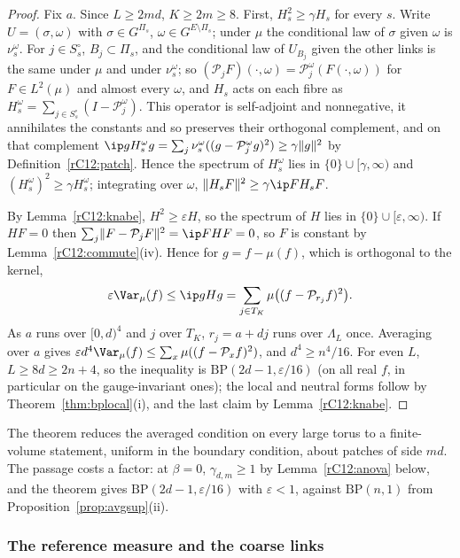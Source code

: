 \begin{proof}
Fix $a$. Since $L\ge2md$, $K\ge2m\ge8$. First, $H_s^2\ge\gamma H_s$ for
every $s$. Write $U=(\sigma,\omega)$ with $\sigma\in G^{\Pi_s}$, $\omega\in
G^{E\setminus\Pi_s}$; under $\mu$ the conditional law of $\sigma$ given
$\omega$ is $\nu^\omega_s$. For $j\in S^\circ_s$, $B_j\subset\Pi_s$, and the
conditional law of $U_{B_j}$ given the other links is the same under $\mu$
and under $\nu^\omega_s$; so $(\mathcal P_jF)(\cdot,\omega)=\mathcal
P^\omega_j(F(\cdot,\omega))$ for $F\in L^2(\mu)$ and almost every $\omega$,
and $H_s$ acts on each fibre as $H^\omega_s=\sum_{j\in S^\circ_s}(I-\mathcal
P^\omega_j)$. This operator is self-adjoint and nonnegative, it annihilates
the constants and so preserves their orthogonal complement, and on that
complement $\ip g{H^\omega_sg}=\sum_j\nu^\omega_s((g-\mathcal P^\omega_j
g)^2)\ge\gamma\lVert g\rVert^2$ by Definition~\ref{rC12:patch}. Hence
the spectrum of $H^\omega_s$ lies in $\{0\}\cup[\gamma,\infty)$ and
$(H^\omega_s)^2\ge\gamma H^\omega_s$; integrating over $\omega$,
$\lVert H_sF\rVert^2\ge\gamma\ip F{H_sF}$.

By Lemma~\ref{rC12:knabe}, $H^2\ge\varepsilon H$, so the spectrum of $H$
lies in $\{0\}\cup[\varepsilon,\infty)$. If $HF=0$ then $\sum_j\lVert F-
\mathcal P_jF\rVert^2=\ip F{HF}=0$, so $F$ is constant by
Lemma~\ref{rC12:commute}(iv). Hence for $g=f-\mu(f)$, which is orthogonal
to the kernel,
\[
\varepsilon\Var_\mu(f)\le\ip g{Hg}=\sum_{j\in T_K}\mu\bigl((f-\mathcal
P_{r_j}f)^2\bigr).
\]
As $a$ runs over $[0,d)^4$ and $j$ over $T_K$, $r_j=a+dj$ runs over
$\Lambda_L$ once. Averaging over $a$ gives $\varepsilon d^4\Var_\mu(f)\le
\sum_x\mu((f-\mathcal P_xf)^2)$, and $d^4\ge n^4/16$. For even $L$,
$L\ge8d\ge2n+4$, so the inequality is $\mathrm{BP}(2d-1,\varepsilon/16)$
(on all real $f$, in particular on the gauge-invariant ones); the local
and neutral forms follow by Theorem~\ref{thm:bplocal}(i), and the last claim
by Lemma~\ref{rC12:knabe}.
\end{proof}

The theorem reduces the averaged condition on every large torus to a
finite-volume statement, uniform in the boundary condition, about patches of
side $md$. The passage costs a factor: at $\beta=0$, $\gamma_{d,m}\ge1$ by
Lemma~\ref{rC12:anova} below, and the theorem gives
$\mathrm{BP}(2d-1,\varepsilon/16)$ with $\varepsilon<1$, against
$\mathrm{BP}(n,1)$ from Proposition~\ref{prop:avgsup}(ii).

\subsubsection{The reference measure and the coarse links}

